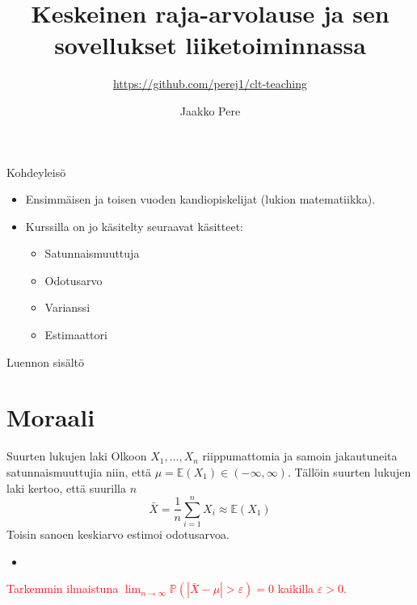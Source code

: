 \documentclass{beamer}
\title{Keskeinen raja-arvolause ja sen sovellukset liiketoiminnassa}
\subtitle{\url{https://github.com/perej1/clt-teaching}}
\author{Jaakko Pere}
\date{\displaydate{date}}
\begin{document}
\frame{\titlepage}


\begin{frame}{Kohdeyleisö}
  \begin{itemize}
    \item Ensimmäisen ja toisen vuoden kandiopiskelijat (lukion matematiikka).
    \pause
    \item Kurssilla on jo käsitelty seuraavat käsitteet:
    \begin{itemize}
      \item Satunnaismuuttuja
      \item Odotusarvo
      \item Varianssi
      \item Estimaattori
    \end{itemize}
  \end{itemize}
\end{frame}


\begin{frame}{Luennon sisältö}
  \tableofcontents
\end{frame}


\section{Moraali}


\begin{frame}{Suurten lukujen laki}
  Olkoon $X_1, \ldots, X_n$ riippumattomia ja samoin jakautuneita
  satunnaismuuttujia niin, että $\mu = \mathbb{E}\left(X_1\right)\in (-\infty,
  \infty)$.
  \pause
  Tällöin suurten lukujen laki kertoo, että suurilla $n$
  \begin{equation*}
    \bar X = \frac{1}{n}\sum_{i=1}^{n} X_i \approx \mathbb{E}\left(X_1\right)
  \end{equation*}
  \pause
  Toisin sanoen keskiarvo estimoi odotusarvoa.
  \begin{itemize}
    \item[]
  \end{itemize}
  \pause
  \textcolor{red}{Tarkemmin ilmaistuna
  $\lim_{n\to\infty}\mathbb{P}\left(\left|\bar X - \mu\right| >
  \varepsilon\right) = 0$ kaikilla $\varepsilon > 0$.}
\end{frame}
\end{document}
